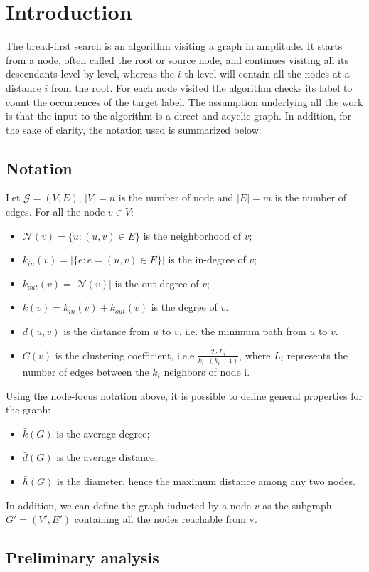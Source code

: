
\section{Introduction}
The bread-first search is an algorithm visiting a graph in amplitude. It starts from a node, 
often called the root or source node, and continues visiting all its descendants level
by level, whereas the $i$-th level will contain all the nodes at a distance 
$i$ from the root.
For each node visited the algorithm checks its label to count the occurrences of the target label.
The assumption underlying all the work is that the input to the algorithm is a direct and 
acyclic graph. In addition, for the sake of clarity, the notation used is summarized below:
\subsection{Notation}
Let $\mathcal{G} = (V, E)$, $|V| = n$ is the number of node and $|E| = m$ is the number of edges. 
For all the node $v \in V$:
\begin{itemize}
    \item $\mathcal{N}(v) = \{u : (u, v) \in E\}$ is the neighborhood of $v$;
    \item $k_{in}(v) = |\{e: e=(u, v) \in E\}|$ is the in-degree of $v$;
    \item $k_{out}(v) = |\mathcal{N}(v)|$ is the out-degree of $v$;
    \item $k(v) = k_{in}(v) + k_{out}(v)$ is the degree of $v$.
    \item $d(u, v)$ is the distance from $u$ to $v$, i.e. the minimum path from $u$ to $v$.
    \item $C(v)$ is the clustering coefficient, i.e.e $\frac{2 \cdot L_i}{k_i\cdot(k_i - 1)}$, where $L_i$ represents the number of edges between the $k_i$ neighbors of node i.
\end{itemize}
Using the node-focus notation above,
 it is possible to define general properties for the graph:
\begin{itemize}
    \item $\bar{k}(G)$ is the average degree;
    \item $\bar{d}(G)$ is the average distance;
    \item $\bar{h}(G)$ is the diameter, hence the maximum distance among any two nodes.
\end{itemize}
In addition, we can define 
the graph inducted by a node $v$ as the subgraph $G'=(V', E')$ containing all the nodes reachable from v.  
\subsection{Preliminary analysis}
